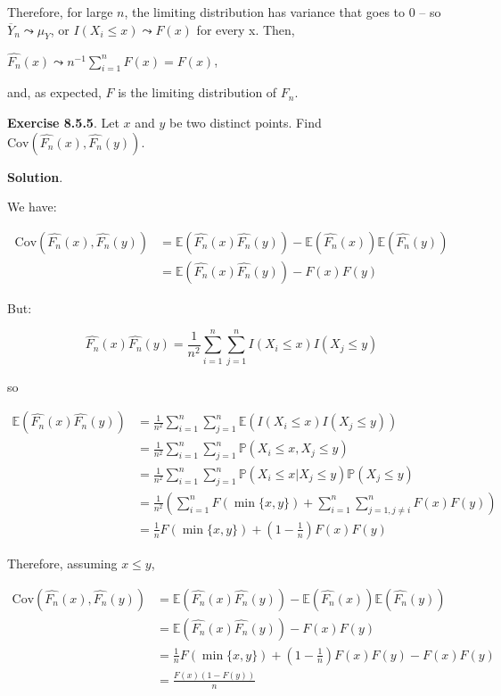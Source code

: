 Therefore, for large \(n\), the limiting distribution has variance that
goes to 0 -- so \(\overline{Y}_{n} \leadsto \mu_Y\), or
\(I\left(X_{i} \leq x \right) \leadsto F(x)\) for every x. Then,

\(\hat{F_{n}}(x) \leadsto n^{-1} \sum_{i=1}^{n} F(x) = F(x)\),

and, as expected, \(F\) is the limiting distribution of \(F_{n}\).

\textbf{Exercise 8.5.5}. Let \(x\) and \(y\) be two distinct points.
Find \(\text{Cov}(\hat{F_{n}}(x), \hat{F_{n}}(y))\).

\textbf{Solution}.

We have:

\begin{align*}
\text{Cov}(\hat{F_{n}}(x), \hat{F_{n}}(y)) & = \mathbb{E}(\hat{F_{n}}(x) \hat{F_{n}}(y)) - \mathbb{E}(\hat{F_{n}}(x))\mathbb{E}(\hat{F_{n}}(y)) \\
&= \mathbb{E}(\hat{F_{n}}(x) \hat{F_{n}}(y)) - F(x)F(y)
\end{align*}

But:

\[
\hat{F_{n}}(x) \hat{F_{n}}(y) = \frac{1}{n^{2}} \sum_{i=1}^{n} \sum_{j=1}^{n} I(X_{i} \leq x) I(X_{j} \leq y)
\]

so

\begin{align*}
\mathbb{E}(\hat{F_{n}}(x) \hat{F_{n}}(y)) & = \frac{1}{n^{2}} \sum_{i=1}^{n} \sum_{j=1}^{n} \mathbb{E}(I(X_{i} \leq x) I(X_{j} \leq y)) \\
&= \frac{1}{n^{2}} \sum_{i=1}^{n} \sum_{j=1}^{n} \mathbb{P}(X_{i} \leq x, X_{j} \leq y) \\
&= \frac{1}{n^{2}} \sum_{i=1}^{n} \sum_{j=1}^{n} \mathbb{P}(X_{i} \leq x | X_{j} \leq y) \mathbb{P}(X_{j} \leq y) \\
&= \frac{1}{n^{2}} \left( \sum_{i=1}^{n} F(\min\{x, y\}) + \sum_{i=1}^{n} \sum_{j=1, j \neq i}^{n} F(x)F(y) \right) \\
&= \frac{1}{n} F(\min\{x, y\}) + \left( 1 - \frac{1}{n}\right) F(x)F(y)
\end{align*}

Therefore, assuming \(x \leq y\),

\begin{align*}
\text{Cov}(\hat{F_{n}}(x), \hat{F_{n}}(y)) & = \mathbb{E}(\hat{F_{n}}(x) \hat{F_{n}}(y)) - \mathbb{E}(\hat{F_{n}}(x))\mathbb{E}(\hat{F_{n}}(y)) \\
&= \mathbb{E}(\hat{F_{n}}(x) \hat{F_{n}}(y)) - F(x)F(y) \\
&= \frac{1}{n} F(\min\{x, y\}) + \left( 1 - \frac{1}{n}\right) F(x)F(y) - F(x)F(y) \\
&= \frac{F(x)(1 - F(y))}{n}
\end{align*}

